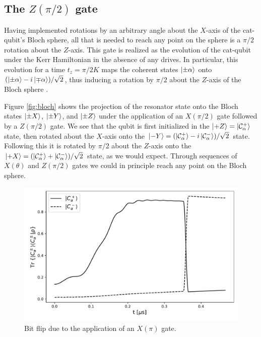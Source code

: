 \subsection{The $Z(\pi/2)$ gate}

Having implemented rotations by an arbitrary angle about the $X$-axis of the cat-qubit's Bloch sphere, all that is needed to reach any point on the sphere is a $\pi/2$ rotation about the $Z$-axis.
This gate is realized as the evolution of the cat-qubit under the Kerr Hamiltonian in the absence of any drives.
In particular, this evolution for a time $t_z = \pi/2K$ maps the coherent states $\ket{\pm \alpha}$ onto $(\ket{\pm \alpha} - i \ket{\mp \alpha}) / \sqrt{2}$, thus inducing a rotation by $\pi/2$ about the $Z$-axis of the Bloch sphere \cite{grimm_2020,mirrahimi_2014}.

Figure \ref{fig:bloch} shows the projection of the resonator state onto the Bloch states $\ket{\pm X}$, $\ket{\pm Y}$, and $\ket{\pm Z}$ under the application of an $X(\pi/2)$ gate followed by a $Z(\pi/2)$ gate.
We see that the qubit is first initialized in the $\ket{+Z} = \ket{\mathcal{C}_\alpha^+}$ state, then rotated about the $X$-axis onto the $\ket{-Y} = (\ket{\mathcal{C}_\alpha^+} - i \ket{\mathcal{C}_\alpha^-}) / \sqrt{2}$ state.
Following this it is rotated by $\pi/2$ about the $Z$-axis onto the $\ket{+X} = (\ket{\mathcal{C}_\alpha^+} + \ket{\mathcal{C}_\alpha^-}) / \sqrt{2}$ state, as we would expect.
Through sequences of $X(\theta)$ and $Z(\pi/2)$ gates we could in principle reach any point on the Bloch sphere.

\begin{figure}[t]
    \centering
    \includegraphics[width=\columnwidth]{figures/x_gate.pdf}
    \caption{Bit flip due to the application of an $X(\pi)$ gate.}
    \label{fig:x_gate}
\end{figure}


